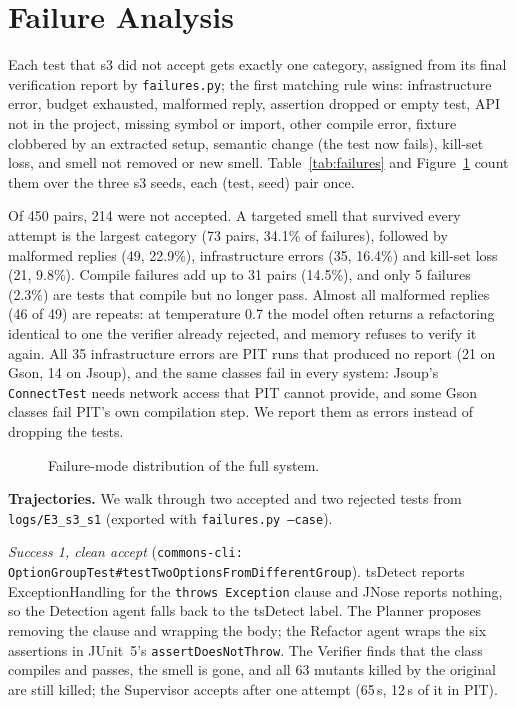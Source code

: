 \section{Failure Analysis}\label{sec:failures}
Each test that \textsf{s3} did not accept gets exactly one category, assigned from its final verification report by \texttt{failures.py}; the first matching rule wins:
infrastructure error, budget exhausted, malformed reply, assertion dropped or empty test, API not in the project, missing symbol or import, other compile error, fixture clobbered by an extracted setup, semantic change (the test now fails), kill-set loss, and smell not removed or new smell.
Table~\ref{tab:failures} and Figure~\ref{fig:failures} count them over the three \textsf{s3} seeds, each (test, seed) pair once.

Of 450 pairs, 214 were not accepted. A targeted smell that survived every attempt is the largest category (73 pairs, 34.1\% of failures), followed by malformed replies (49, 22.9\%), infrastructure errors (35, 16.4\%) and kill-set loss (21, 9.8\%).
Compile failures add up to 31 pairs (14.5\%), and only 5 failures (2.3\%) are tests that compile but no longer pass.
Almost all malformed replies (46 of 49) are repeats: at temperature 0.7 the model often returns a refactoring identical to one the verifier already rejected, and memory refuses to verify it again. All 35 infrastructure errors are PIT runs that produced no report (21 on Gson, 14 on Jsoup), and the same classes fail in every system: Jsoup's \texttt{ConnectTest} needs network access that PIT cannot provide, and some Gson classes fail PIT's own compilation step. We report them as errors instead of dropping the tests.
\begin{table}[t]\centering\caption{Failure modes of the full system (E3, three seeds, 450 test--seed pairs).}\label{tab:failures}\footnotesize{}\end{table}
\begin{figure}[t]\centering{}\caption{Failure-mode distribution of the full system.}\label{fig:failures}\end{figure}

\textbf{Trajectories.} We walk through two accepted and two rejected tests from \texttt{logs/E3\_s3\_s1} (exported with \texttt{failures.py --case}).

\emph{Success 1, clean accept} (\texttt{commons-cli: OptionGroupTest\#\allowbreak testTwoOptionsFromDifferentGroup}). tsDetect reports ExceptionHandling for the \texttt{throws Exception} clause and JNose reports nothing, so the Detection agent falls back to the tsDetect label. The Planner proposes removing the clause and wrapping the body; the Refactor agent wraps the six assertions in JUnit~5's \texttt{assertDoesNotThrow}. The Verifier finds that the class compiles and passes, the smell is gone, and all 63 mutants killed by the original are still killed; the Supervisor accepts after one attempt (65\,s, 12\,s of it in PIT).

